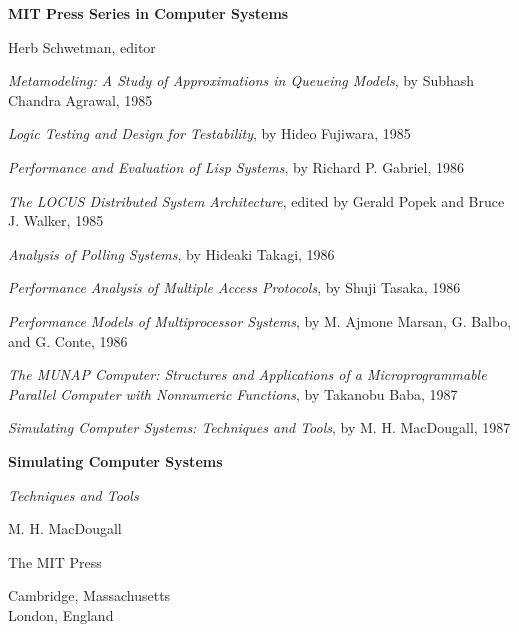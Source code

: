 
\clearpage
\thispagestyle{empty}
\begingroup
\setlength{\parindent}{0pt}
\setlength{\parskip}{0.88\baselineskip}
\vspace*{1.3cm}

{\bfseries MIT Press Series in Computer Systems\par}
Herb Schwetman, editor

\vspace{0.95cm}
\textit{Metamodeling: A Study of Approximations in Queueing Models}, by Subhash Chandra Agrawal, 1985

\textit{Logic Testing and Design for Testability}, by Hideo Fujiwara, 1985

\textit{Performance and Evaluation of Lisp Systems}, by Richard P. Gabriel, 1986

\textit{The LOCUS Distributed System Architecture}, edited by Gerald Popek and Bruce J. Walker, 1985

\textit{Analysis of Polling Systems}, by Hideaki Takagi, 1986

\textit{Performance Analysis of Multiple Access Protocols}, by Shuji Tasaka, 1986

\textit{Performance Models of Multiprocessor Systems}, by M. Ajmone Marsan, G. Balbo, and G. Conte, 1986

\textit{The MUNAP Computer: Structures and Applications of a Microprogrammable Parallel Computer with Nonnumeric Functions}, by Takanobu Baba, 1987

\textit{Simulating Computer Systems: Techniques and Tools}, by M. H. MacDougall, 1987
\endgroup

\clearpage
\thispagestyle{empty}
\begin{center}
  \vspace*{2.6cm}
  {\Huge \bfseries Simulating Computer Systems\par}
  \vspace{0.8cm}
  {\Large \itshape Techniques and Tools\par}
  \vspace{2.4cm}
  {\Large M. H. MacDougall\par}
  \vfill
  {\Large The MIT Press\par}
  \vspace{0.4cm}
  Cambridge, Massachusetts\\
  London, England
\end{center}

